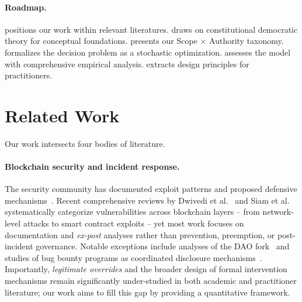 \documentclass[12pt]{article}
\begin{document}
\paragraph{Roadmap.}
 positions our work within relevant literatures.
 draws on constitutional democratic theory for conceptual foundations.
 presents our Scope $\times$ Authority taxonomy.
 formalizes the decision problem as a stochastic optimization.
 assesses the model with comprehensive empirical analysis.
 extracts design principles for practitioners.
\fi


\section{Related Work}
\label{sec:related}

Our work intersects four bodies of literature.
\paragraph{Blockchain security and incident response.}
The security community has documented exploit patterns and proposed defensive mechanisms~\cite{CharoenwongBernardi2021Hacks}. Recent comprehensive reviews by Dwivedi et al.~\cite{Dwivedi2024BlockchainAttacks} and Siam et al.~\cite{Siam2025SecuringBlockchain} systematically categorize vulnerabilities across blockchain layers -- from network-level attacks to smart contract exploits -- yet most work focuses on documentation and \emph{ex-post} analyses rather than prevention, preemption, or post-incident governance. Notable exceptions include analyses of the DAO fork~\cite{ETCAnnouncement2016} and studies of bug bounty programs as coordinated disclosure mechanisms~\cite{Badash2021BugBounty}.
Importantly, \emph{legitimate overrides} and the broader design of formal intervention mechanisms remain significantly under-studied in both academic and practitioner literature; our work aims to fill this gap by providing a quantitative framework.
\end{document}
